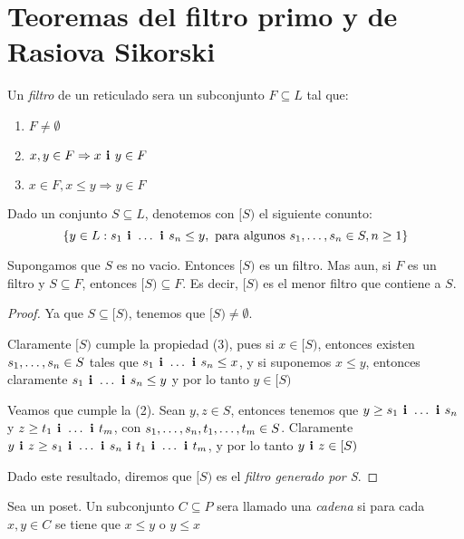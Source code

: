 \section{Teoremas del filtro primo y de Rasiova Sikorski}
\begin{definition}
  Un \emph{filtro} de un reticulado \reticulAlg sera un subconjunto $F \subseteq L$ tal que:
  \begin{enumerate}
    \item $F \neq \emptyset$
    \item $x, y \in F \Rightarrow \infbin{x}{y} \in F$
    \item $x \in F, x \leq y \Rightarrow y \in F$
  \end{enumerate}
\end{definition}

\begin{definition}
  Dado un conjunto $S \subseteq L$, denotemos con $[S)$ el siguiente conunto:
  $$
  \{y \in L : \succession[\textbf{ i }]{s}{1}{n} \leq y, \text{ para algunos } \succession{s}{1}{n} \in S, n \geq 1\}
  $$
\end{definition}
\begin{lemma}
  Supongamos que $S$ es no vacio. Entonces $[S)$ es un filtro. Mas aun, si $F$ es un filtro y $S \subseteq F$, entonces
  $[S) \subseteq F$. Es decir, $[S)$ es el menor filtro que contiene a $S$.
\end{lemma}
\begin{proof}
  Ya que $S \subseteq [S)$, tenemos que $[S) \neq \emptyset$.
  
  Claramente $[S)$ cumple la propiedad (3), pues si $x \in [S)$, entonces existen $\succession{s}{1}{n}\in S$ tales que $\succession[\textbf{ i }]{s}{1}{n} \leq x$, y si suponemos $x \leq y$,
  entonces claramente $\succession[\textbf{ i }]{s}{1}{n}\leq y$ y por lo tanto $y\in [S)$

  Veamos que cumple la (2). Sean $y, z \in S$, entonces tenemos que $y \geq \succession[\textbf{ i }]{s}{1}{n}$ y
  $z \geq \succession[\textbf{ i }]{t}{1}{m}$, con $\succession{s}{1}{n}, \succession{t}{1}{m} \in S$. Claramente $\infbin{y}{z} \geq \infbin{\succession[\textbf{ i }]{s}{1}{n}}{\succession[\textbf{ i }]{t}{1}{m}}$,
  y por lo tanto $\infbin{y}{z}\in [S)$

  Dado este resultado, diremos que $[S)$ es el \emph{filtro generado por S}.
\end{proof}

\begin{definition}
  Sea \poset un poset. Un subconjunto $C \subseteq P$ sera llamado una \emph{cadena} si para cada
  $x, y \in C$ se tiene que $x \leq y$ o $y \leq x$
\end{definition}

